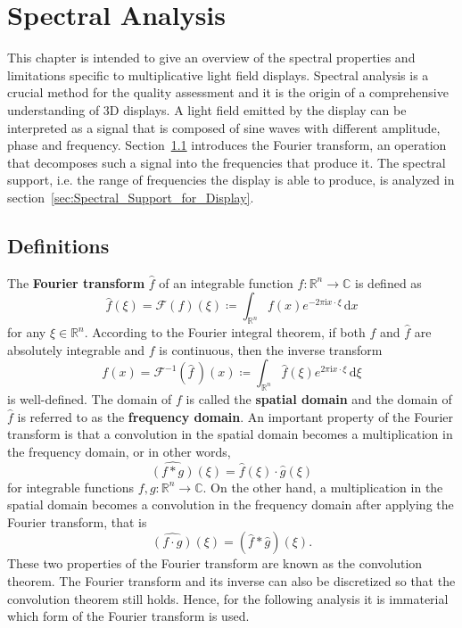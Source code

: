 \chapter{Spectral Analysis}
\label{chp:spectral_analysis}

This chapter is intended to give an overview of the spectral properties and limitations specific to multiplicative light field displays.
Spectral analysis is a crucial method for the quality assessment and it is the origin of a comprehensive understanding of 3D displays. 
A light field emitted by the display can be interpreted as a signal that is composed of sine waves with different amplitude, phase and frequency.
Section~\ref{sec:Definitions} introduces the Fourier transform, an operation that decomposes such a signal into the frequencies that produce it.
The spectral support, i.e. the range of frequencies the display is able to produce, is analyzed in section~\ref{sec:Spectral_Support_for_Display}. 

\section{Definitions}
\label{sec:Definitions}

The \textbf{Fourier transform} $\widehat{f}$ of an integrable function $f \colon \mathbb{R}^n \to \mathbb{C}$ is defined as 
\begin{equation}
	\widehat{f}(\xi) = \mathcal{F}(f)(\xi) \coloneqq \int_{\mathbb{R}^n} f(x) e^{-2 \pi \mathrm{i} x \cdot \xi} \, \mathrm{d}x
\end{equation}
for any $\xi \in \mathbb{R}^n$. 
According to the Fourier integral theorem, if both $f$ and $\widehat{f}$ are absolutely integrable and $f$ is continuous, then the inverse transform 
\begin{equation}
	f(x) = \mathcal{F}^{-1}(\widehat{f} \, )(x) \coloneqq \int_{\mathbb{R}^n} \widehat{f}(\xi) e^{2 \pi \mathrm{i} x \cdot \xi} \, \mathrm{d}\xi
\end{equation}
is well-defined.
The domain of $f$ is called the \textbf{spatial domain} and the domain of $\widehat{f}$ is referred to as the \textbf{frequency domain}.
An important property of the Fourier transform is that a convolution in the spatial domain becomes a multiplication in the frequency domain, or in other words, 
\begin{equation}\label{eq:convolution_theorem_1}
	\widehat{(f \ast g)}(\xi) = \widehat{f}(\xi) \cdot \widehat{g}(\xi)
\end{equation}
for integrable functions $f, g \colon \mathbb{R}^n \to \mathbb{C}$.
On the other hand, a multiplication in the spatial domain becomes a convolution in the frequency domain after applying the Fourier transform, that is
\begin{equation}\label{eq:convolution_theorem_2}
	\widehat{(f \cdot g)}(\xi) = (\widehat{f} \ast \widehat{g})(\xi).
\end{equation}
These two properties of the Fourier transform are known as the convolution theorem.
The Fourier transform and its inverse can also be discretized so that the convolution theorem still holds.
Hence, for the following analysis it is immaterial which form of the Fourier transform is used.

